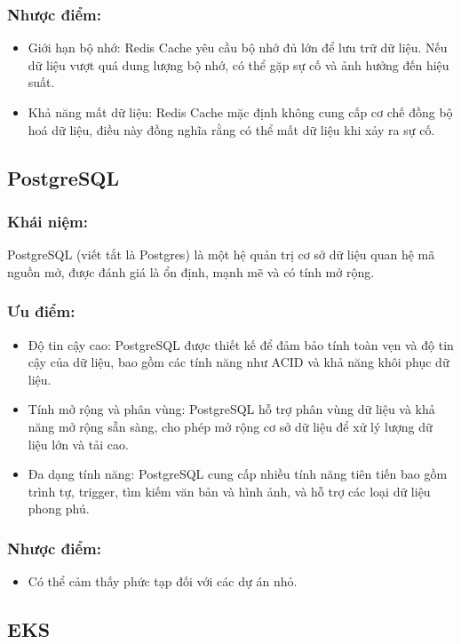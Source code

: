 \subsubsection{Nhược điểm:}
\begin{itemize}
    \item Giới hạn bộ nhớ: Redis Cache yêu cầu bộ nhớ đủ lớn để lưu trữ dữ liệu. Nếu dữ liệu vượt quá dung lượng bộ nhớ, có thể gặp sự cố và ảnh hưởng đến hiệu suất.
    \item Khả năng mất dữ liệu: Redis Cache mặc định không cung cấp cơ chế đồng bộ hoá dữ liệu, điều này đồng nghĩa rằng có thể mất dữ liệu khi xảy ra sự cố.
\end{itemize}
\subsection{PostgreSQL}
\subsubsection{Khái niệm:}
\indent PostgreSQL (viết tắt là Postgres) là một hệ quản trị cơ sở dữ liệu quan hệ mã nguồn mở, được đánh giá là ổn định, mạnh mẽ và có tính mở rộng.
\subsubsection{Ưu điểm:}
\begin{itemize}
    \item Độ tin cậy cao: PostgreSQL được thiết kế để đảm bảo tính toàn vẹn và độ tin cậy của dữ liệu, bao gồm các tính năng như ACID và khả năng khôi phục dữ liệu.
    \item Tính mở rộng và phân vùng: PostgreSQL hỗ trợ phân vùng dữ liệu và khả năng mở rộng sẵn sàng, cho phép mở rộng cơ sở dữ liệu để xử lý lượng dữ liệu lớn và tải cao.
    \item Đa dạng tính năng: PostgreSQL cung cấp nhiều tính năng tiên tiến bao gồm trình tự, trigger, tìm kiếm văn bản và hình ảnh, và hỗ trợ các loại dữ liệu phong phú.
\end{itemize}
\subsubsection{Nhược điểm:}
\begin{itemize}
    \item Có thể cảm thấy phức tạp đối với các dự án nhỏ.
\end{itemize}
\subsection{EKS}
